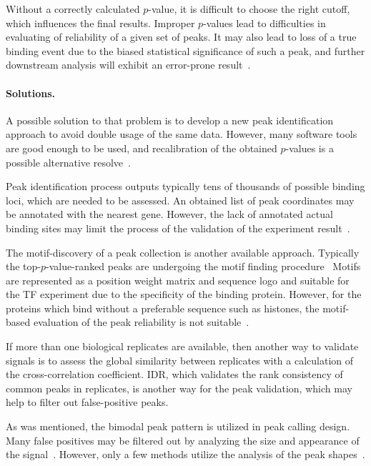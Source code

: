 Without a correctly calculated $p$-value, it is difficult to choose the right cutoff, which influences the final results. 
Improper $p$-values lead to difficulties in evaluating of reliability of a given set of peaks.
It may also lead to loss of a true binding event due to the biased statistical significance of such a peak, and further downstream analysis will exhibit an error-prone result~\cite{chitpin2019recap}. 

\paragraph{Solutions.}
A possible solution to that problem is to develop a new peak identification approach to avoid double usage of the same data. 
However, many software tools are good enough to be used, and recalibration of the obtained $p$-values is a possible alternative resolve~\cite{chitpin2019recap}.


Peak identification process outputs typically tens of thousands of possible binding loci, which are needed to be assessed. 
An obtained list of peak coordinates may be annotated with the nearest gene. 
However, the lack of annotated actual binding sites may limit the process of the validation of the experiment result~\cite{nakato2017recent}.

The motif-discovery of a peak collection is another available approach. 
Typically the top-$p$-value-ranked peaks are undergoing the motif finding procedure~\cite{bailey2011dreme}
Motifs are represented as a position weight matrix and sequence logo and suitable for the TF experiment due to the specificity of the binding protein.
However, for the proteins which bind without a preferable sequence such as histones, the motif-based evaluation of the peak reliability is not suitable~\cite{nakato2017recent}. 

If more than one biological replicates are available, then another way to validate signals is to assess the global similarity between replicates with a calculation of the cross-correlation coefficient. 
IDR, which validates the rank consistency of common peaks in replicates, is another way for the peak validation, which may help to filter out false-positive peaks. 

As  was mentioned, the bimodal peak pattern is utilized in peak calling design. 
Many false positives may be filtered out by analyzing the size and appearance of the signal~\cite{rye2011manually}. 
However, only a few methods utilize the analysis of the peak shapes~\cite{hower2011shape, wu2014polyapeak}.
